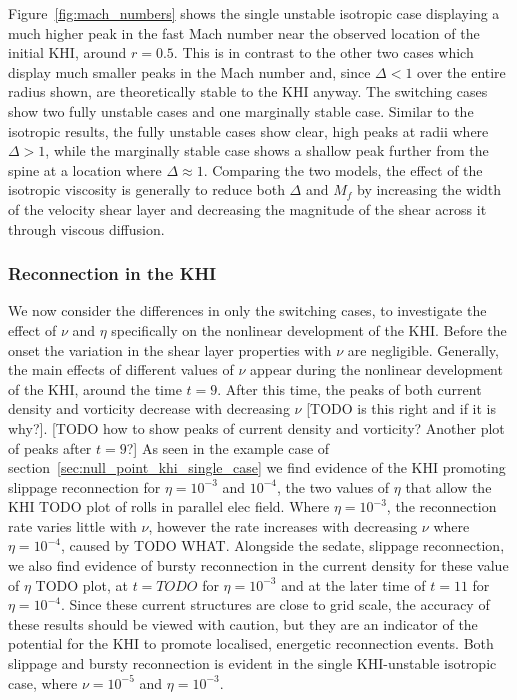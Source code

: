Figure~\ref{fig:mach_numbers} shows the single unstable isotropic case displaying a much higher peak in the fast Mach number near the observed location of the initial KHI, around $r=0.5$. This is in contrast to the other two cases which display much smaller peaks in the Mach number and, since $\Delta < 1$ over the entire radius shown, are theoretically stable to the KHI anyway. The switching cases show two fully unstable cases and one marginally stable case. Similar to the isotropic results, the fully unstable cases show clear, high peaks at radii where $\Delta > 1$, while the marginally stable case shows a shallow peak further from the spine at a location where $\Delta \approx 1$. Comparing the two models, the effect of the isotropic viscosity is generally to reduce both $\Delta$ and $M_f$ by increasing the width of the velocity shear layer and decreasing the magnitude of the shear across it through viscous diffusion.

\subsubsection{Reconnection in the KHI}

We now consider the differences in only the switching cases, to investigate the effect of $\nu$ and $\eta$ specifically on the nonlinear development of the KHI. Before the onset the variation in the shear layer properties with $\nu$ are negligible. Generally, the main effects of different values of $\nu$ appear during the nonlinear development of the KHI, around the time $t=9$. After this time, the peaks of both current density and vorticity decrease with decreasing $\nu$ [TODO is this right and if it is why?]. [TODO how to show peaks of current density and vorticity? Another plot of peaks after $t=9$?] As seen in the example case of section~\ref{sec:null_point_khi_single_case} we find evidence of the KHI promoting slippage reconnection for $\eta = 10^{-3}$ and $10^{-4}$, the two values of $\eta$ that allow the KHI TODO plot of rolls in parallel elec field. Where $\eta=10^{-3}$, the reconnection rate varies little with $\nu$, however the rate increases with decreasing $\nu$ where $\eta=10^{-4}$, caused by TODO WHAT. Alongside the sedate, slippage reconnection, we also find evidence of bursty reconnection in the current density for these value of $\eta$ TODO plot, at $t=TODO$ for $\eta=10^{-3}$ and at the later time of $t=11$ for $\eta=10^{-4}$. Since these current structures are close to grid scale, the accuracy of these results should be viewed with caution, but they are an indicator of the potential for the KHI to promote localised, energetic reconnection events. Both slippage and bursty reconnection is evident in the single KHI-unstable isotropic case, where $\nu=10^{-5}$ and $\eta=10^{-3}$.

